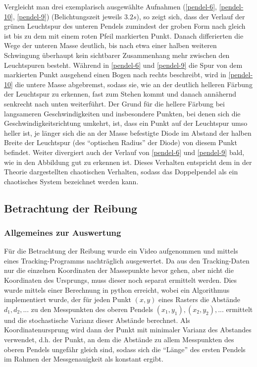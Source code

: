 Vergleicht man drei exemplarisch ausgewählte Aufnahmen (\ref{pendel-6}, \ref{pendel-10}, \ref{pendel-9}) (Belichtungszeit jeweils $3.2s$), so zeigt sich, dass der Verlauf der grünen Leuchtspur des unteren Pendels zumindest der groben Form nach gleich ist bis zu dem mit einem roten Pfeil markierten Punkt. Danach differierten die Wege der unteren Masse deutlich, bis nach etwa einer halben weiteren Schwingung überhaupt kein sichtbarer Zusammenhang mehr zwischen den Leuchtspuren besteht. Während in \ref{pendel-6} und \ref{pendel-9} die Spur von dem markierten Punkt ausgehend einen Bogen nach rechts beschreibt, wird in \ref{pendel-10} die untere Masse abgebremst, sodass sie, wie an der deutlich helleren Färbung der Leuchtspur zu erkennen, fast zum Stehen kommt und danach annähernd senkrecht nach unten weiterführt. Der Grund für die hellere Färbung bei langsameren Geschwindigkeiten und insbesondere Punkten, bei denen sich die Geschwindigkeitsrichtung umkehrt, ist, dass ein Punkt auf der Leuchtspur umso heller ist, je länger sich die an der Masse befestigte Diode im Abstand der halben Breite der Leuchtspur (des \enquote{optischen Radius} der Diode) von diesem Punkt befindet. 
Weiter divergiert auch der Verlauf von \ref{pendel-6} und \ref{pendel-9} bald, wie in den Abbildung gut zu erkennen ist. 
Dieses Verhalten entspricht dem in der Theorie dargestellten chaotischen Verhalten, sodass das Doppelpendel als ein chaotisches System bezeichnet werden kann. 

\subsection{Betrachtung der Reibung}

\subsubsection{Allgemeines zur Auswertung}
Für die Betrachtung der Reibung wurde ein Video aufgenommen und mittels eines Tracking-Programms nachträglich ausgewertet. 
Da aus den Tracking-Daten nur die einzelnen Koordinaten der Massepunkte hevor gehen, aber nicht die Koordinaten des Ursprungs, muss dieser noch separat ermittelt werden. Dies wurde mittels einer Berechnung in python erreicht, wobei ein Algorithmus implementiert wurde, der für jeden Punkt $(x, y)$ eines Rasters die Abstände $d_1, d_2, ... $ zu den Messpunkten des oberen Pendels $(x_1, y_1), (x_2, y_2), ...$ ermittelt und die stochastische Varianz dieser Abstände berechnet. Als Koordinatenursprung wird dann der Punkt mit minimaler Varianz des Abstandes verwendet, d.h. der Punkt, an dem die Abstände zu allem Messpunkten des oberen Pendels ungefähr gleich sind, sodass sich die \enquote{Länge} des ersten Pendels im Rahmen der Messgenauigkeit als konstant ergibt.  


